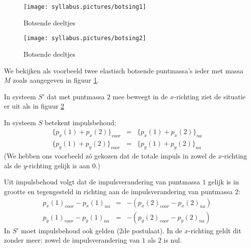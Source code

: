 
\begin{figure}[ht]
\centering
\texttt{[image: syllabus.pictures/botsing1]}
\caption{Botsende deeltjes}
\label{f:impuls1}
\end{figure}



\begin{figure}[ht]
\centering
\texttt{[image: syllabus.pictures/botsing2]}
\caption{Botsende deeltjes}
\label{f:impuls2}
\end{figure}


We bekijken als voorbeeld twee elastisch botsende puntmassa's ieder met
massa $M$ zoals aangegeven in figuur \ref{f:impuls1}. 

In systeem $S'$ dat met puntmassa $2$ mee beweegt in de $x$-richting
ziet de situatie er uit als in figuur \ref{f:impuls2}

In systeem $S$ betekent impulsbehoud;
\begin{eqnarray*}
\{p_{x}(1) + p_{x}(2)\}_{voor} & = & \{p_{x}(1) + p_{x}(2)\}_{na} \\
\{p_{y}(1) + p_{y}(2)\}_{voor} & = & \{p_{y}(1) + p_{y}(2)\}_{na}
\end{eqnarray*}
(We hebben ons voorbeeld z\'{o} gekozen dat de totale impuls in zowel 
de $x$-richting als de $y$-richting gelijk is aan 0.)

Uit impulsbehoud volgt dat de impulsverandering van puntmassa $1$ gelijk is in
grootte en tegengesteld in richting aan de impulsverandering van puntmassa
$2$:
\begin{eqnarray*}
p_{x}(1)_{voor} - p_{x}(1)_{na} & = & 
-(p_{x}(2)_{voor} - p_{x}(2)_{na})  \\
p_{y}(1)_{voor} - p_{y}(1)_{na} & = & 
-(p_{y}(2)_{voor} - p_{y}(2)_{na})
\end{eqnarray*}
In $S'$ moet impulsbehoud ook gelden (2de postulaat).
In de $x$-richting geldt dit zonder meer: zowel de impulsverandering van $1$ 
als $2$ is nul.

